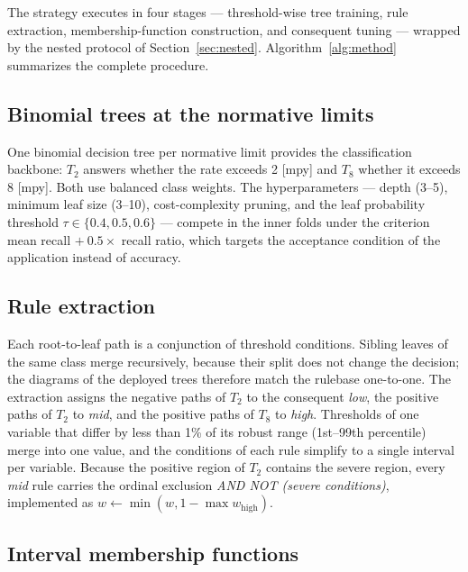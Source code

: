 The strategy executes in four stages --- threshold-wise tree training, rule extraction, membership-function construction, and consequent tuning --- wrapped by the nested protocol of Section~\ref{sec:nested}. Algorithm~\ref{alg:method} summarizes the complete procedure.



\subsection{Binomial trees at the normative limits}

One binomial decision tree per normative limit provides the classification backbone: $T_2$ answers whether the rate exceeds 2 [mpy] and $T_8$ whether it exceeds 8 [mpy]. Both use balanced class weights. The hyperparameters --- depth (3--5), minimum leaf size (3--10), cost-complexity pruning, and the leaf probability threshold $\tau \in \{0.4, 0.5, 0.6\}$ --- compete in the inner folds under the criterion mean recall $+\ 0.5 \times$ recall ratio, which targets the acceptance condition of the application instead of accuracy.

\subsection{Rule extraction}

Each root-to-leaf path is a conjunction of threshold conditions. Sibling leaves of the same class merge recursively, because their split does not change the decision; the diagrams of the deployed trees therefore match the rulebase one-to-one. The extraction assigns the negative paths of $T_2$ to the consequent \emph{low}, the positive paths of $T_2$ to \emph{mid}, and the positive paths of $T_8$ to \emph{high}. Thresholds of one variable that differ by less than 1\% of its robust range (1st--99th percentile) merge into one value, and the conditions of each rule simplify to a single interval per variable. Because the positive region of $T_2$ contains the severe region, every \emph{mid} rule carries the ordinal exclusion \emph{AND NOT (severe conditions)}, implemented as $w \leftarrow \min(w, 1 - \max w_{\mathrm{high}})$.

\subsection{Interval membership functions}

